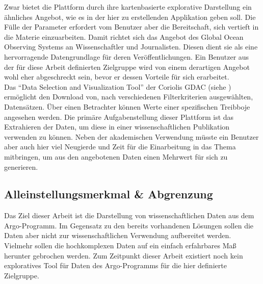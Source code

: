 Zwar bietet die Plattform durch ihre kartenbasierte explorative Darstellung ein ähnliches Angebot, wie es in der hier zu erstellenden Applikation geben soll. Die Fülle der Parameter erfordert vom Benutzer aber die Bereitschaft, sich vertieft in die Materie einzuarbeiten. Damit richtet sich das Angebot des Global Ocean Observing Systems an Wissenschaftler und Journalisten. Diesen dient sie als eine hervorragende Datengrundlage für deren Veröffentlichungen. Ein Benutzer aus der für diese Arbeit definierten Zielgruppe wird von einem derartigen Angebot wohl eher abgeschreckt sein, bevor er dessen Vorteile für sich erarbeitet.
\\

Das "`Data Selection and Visualization Tool"' der Coriolis GDAC  (siehe \cite{ArgoDataSelection}) ermöglicht den Download von, nach verschiedenen Filterkriterien ausgewählten, Datensätzen. Über einen Betrachter können Werte einer spezifischen Treibboje angesehen werden.
Die primäre Aufgabenstellung dieser Plattform ist das Extrahieren der Daten, um diese in einer wissenschaftlichen Publikation verwenden zu können. Neben der akademischen Verwendung müsste ein Benutzer aber auch hier viel Neugierde und Zeit für die Einarbeitung in das Thema mitbringen, um aus den angebotenen Daten einen Mehrwert für sich zu generieren.


\subsection{Alleinstellungsmerkmal \& Abgrenzung}

Das Ziel dieser Arbeit ist die Darstellung von wissenschaftlichen Daten aus dem Argo-Programm. Im Gegensatz zu den bereits vorhandenen Lösungen sollen die Daten aber nicht zur wissenschaftlichen Verwendung aufbereitet werden. Vielmehr sollen die hochkomplexen Daten auf ein einfach erfahrbares Maß herunter gebrochen werden. Zum Zeitpunkt dieser Arbeit existiert noch kein exploratives Tool für Daten des Argo-Programms für die hier definierte Zielgruppe.
